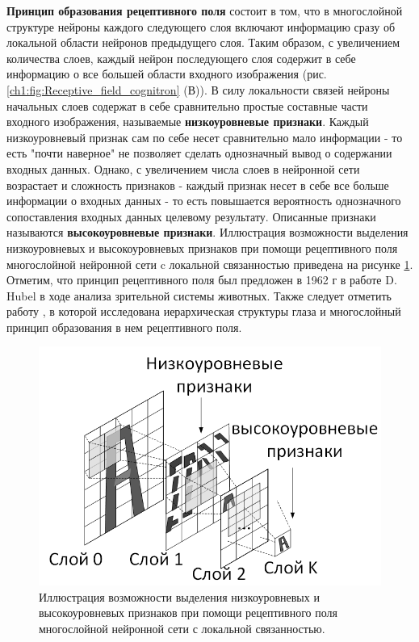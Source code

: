 \documentclass[12pt]{article}
\begin{document}
\begin{sloppypar}
\textbf{Принцип образования рецептивного поля} состоит в том, что в многослойной структуре нейроны каждого следующего слоя включают информацию сразу об локальной области нейронов предыдущего слоя. Таким образом, с увеличением количества слоев, каждый нейрон последующего слоя содержит в себе информацию о все большей области входного изображения (рис. \ref{ch1:fig:Receptive_field_cognitron} (В)). 
В силу локальности связей нейроны начальных слоев содержат в себе сравнительно простые составные части входного изображения, называемые \textbf{низкоуровневые признаки}. 
Каждый низкоуровневый признак сам по себе несет сравнительно мало информации - то есть "почти наверное" не позволяет сделать однозначный вывод о содержании входных данных. Однако, с увеличением числа слоев в нейронной сети возрастает и сложность признаков - каждый признак несет в себе все больше информации о входных данных - то есть повышается вероятность однозначного сопоставления входных данных целевому результату. 
Описанные признаки называются \textbf{высокоуровневые признаки}.
Иллюстрация возможности выделения низкоуровневых  и высокоуровневых признаков при помощи рецептивного поля многослойной нейронной сети c локальной связанностью приведена на рисунке 
\ref{ch1:fig:receptive_field_feature_level}. Отметим, что принцип рецептивного поля был предложен в 1962 г в работе D. Hubel \cite{hubel1962receptive} в ходе анализа зрительной системы животных. Также следует отметить работу \cite{marr1982vision}, в которой    исследована иерархическая структуры глаза и многослойный принцип образования в нем рецептивного поля. 
    
    \begin{figure}
    	\begin{center}
    		\includegraphics[width=0.7\linewidth]{./figuresch1/receptive_field_feature_level.png}
    		\caption{Иллюстрация возможности выделения низкоуровневых  и высокоуровневых признаков при помощи рецептивного поля многослойной нейронной сети с локальной связанностью.}		
    		\label{ch1:fig:receptive_field_feature_level}
    	\end{center}
    \end{figure}


\end{sloppypar}
\end{document}
